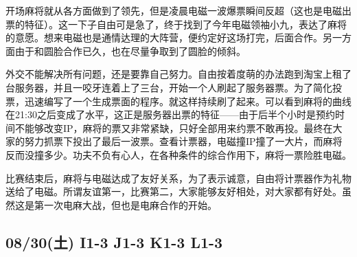 开场麻将就从各方面做到了领先，但是凌晨电磁一波爆票瞬间反超（这也是电磁出票的特征）。这一下子自由可是急了，终于找到了今年电磁领袖小九，表达了麻将的意愿。想来电磁也是通情达理的大阵营，便约定好这场打完，后面合作。另一方面由于和圆脸合作已久，也在尽量争取到了圆脸的倾斜。

外交不能解决所有问题，还是要靠自己努力。自由按着度萌的办法跑到淘宝上租了台服务器，并且一咬牙连着上了三台，开始一个人刷起了服务器票。为了简化投票，迅速编写了一个生成票面的程序。就这样持续刷了起来。可以看到麻将的曲线在21:30之后变成了水平，这正是服务器出票的特征——由于后半个小时是预约时间不能够改变IP，麻将的票又非常紧缺，只好全部用来约票不敢再投。最终在大家的努力抓票下投出了最后一波票。查看计票器，电磁撞IP撞了一大片，而麻将反而没撞多少。功夫不负有心人，在各种条件的综合作用下，麻将一票险胜电磁。

比赛结束后，麻将与电磁达成了友好关系，为了表示诚意，自由将计票器作为礼物送给了电磁。所谓友谊第一，比赛第二，大家能够友好相处，对大家都有好处。虽然这是第一次电麻大战，但也是电麻合作的开始。

\subsection{08/30(土) I1-3 J1-3 K1-3 L1-3}


